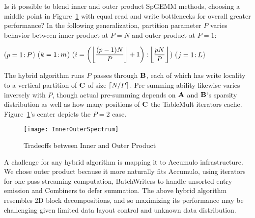 Is it possible to blend inner and outer product SpGEMM methods,
choosing a middle point in Figure~\ref{fInnerOuterSpectrum}
with equal read and write bottlenecks for overall greater performance?
In the following generalization, 
partition parameter $P$ varies behavior between
inner product at $P=N$ and outer product at $P=1$:

\removelatexerror
\begin{algorithm}[H]
\vspace{\algspace}
\fore($p = 1\colon\! P$){
\fore($k = 1\colon\! m$){
\fore({$i = \left( \floor*{\dfrac{(p-1)N}{P}}+1 \right) \col \floor*{\dfrac{p N}{P}}$}){
\fore($j = 1\colon\! L$){
}}}}
\vspace{\algspace}
\end{algorithm}

The hybrid algorithm runs $P$ passes through $\mathbf{B}$,
each of which has write locality to a vertical partition of $\mathbf{C}$ of size $\lceil N / P\rceil$.
Pre-summing ability likewise varies inversely with $P$, 
though actual pre-summing depends on
$\mathbf{A}$ and $\mathbf{B}$'s  sparsity distribution
as well as how many positions of $\mathbf{C}$ the TableMult iterators cache.
Figure~\ref{fInnerOuterSpectrum}'s center depicts the $P=2$ case.

\begin{figure}[htb]
\vspace{-4pt}
\centering
\texttt{[image: InnerOuterSpectrum]}
\vspace{-14pt}
\caption{Tradeoffs between Inner and Outer Product}
\label{fInnerOuterSpectrum}
\end{figure}


A challenge for any hybrid algorithm is mapping it to Accumulo infrastructure.
We chose outer product because it more naturally fits Accumulo, 
using iterators for one-pass streaming computation, 
BatchWriters to handle unsorted entry emission and Combiners to defer summation.
The above hybrid algorithm resembles 2D block decompositions,
and so maximizing its performance may be challenging 
given limited data layout control and unknown data distribution.

